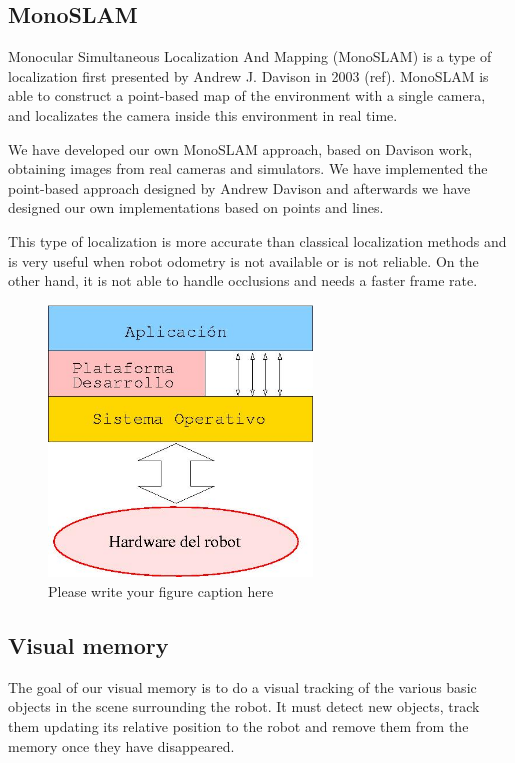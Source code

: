 \documentclass[twocolumn]{svjour3}          %
\begin{document}
\subsection{MonoSLAM}

Monocular Simultaneous Localization And Mapping (MonoSLAM) is a type of localization first presented by Andrew J. Davison in 2003 (ref). MonoSLAM is able to construct a point-based map of the environment with a single camera, and localizates the camera inside this environment in real time.

We have developed our own MonoSLAM approach, based on Davison work, obtaining images from real cameras and simulators. We have implemented the point-based approach designed by Andrew Davison and afterwards we have designed our own implementations based on points and lines.

This type of localization is more accurate than classical localization methods and is very useful when robot odometry is not available or is not reliable. On the other hand, it is not able to handle occlusions and needs a faster frame rate.

\begin{figure}
  \includegraphics[width=7cm]{figs/programacion3.jpg}
\caption{Please write your figure caption here}
\label{fig:2}       %
\end{figure}


\subsection{Visual memory}

The goal of our visual memory is to do a visual tracking of the various basic objects in the scene surrounding the robot. It must detect new objects, track them updating its relative position to the robot and remove them from the memory once they have disappeared.
\end{document}
